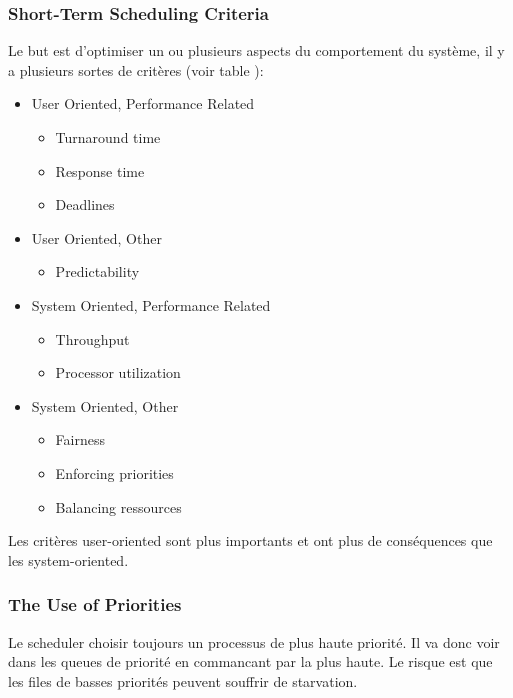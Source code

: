 \subsubsection{Short-Term Scheduling Criteria}
Le but est d'optimiser un ou plusieurs aspects du comportement du système, il y a plusieurs sortes de critères (voir table \cite[p.~401]{stallings}):
\begin{itemize}
  \item User Oriented, Performance Related
    \begin{itemize}
      \item Turnaround time
      \item Response time
      \item Deadlines
    \end{itemize}
  \item User Oriented, Other
    \begin{itemize}
      \item Predictability
    \end{itemize}
  \item System Oriented, Performance Related
    \begin{itemize}
      \item Throughput
      \item Processor utilization
    \end{itemize}
  \item System Oriented, Other
    \begin{itemize}
      \item Fairness
      \item Enforcing priorities
      \item Balancing ressources
    \end{itemize}
\end{itemize}

Les critères user-oriented sont plus importants et ont plus de conséquences que les system-oriented.

\subsubsection{The Use of Priorities}
Le scheduler choisir toujours un processus de plus haute priorité.
Il va donc voir dans les queues de priorité en commancant par la plus haute.
Le risque est que les files de basses priorités peuvent souffrir de starvation.

